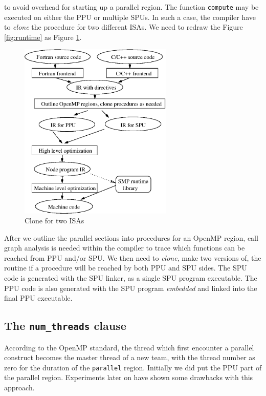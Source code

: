 to avoid overhead for starting up
a parallel region. The function \texttt{compute} may be executed on
either the PPU or multiple SPUs. In such a case, the compiler have to
\emph{clone} the procedure for two different ISAs. We need to redraw
the Figure \ref{fig:runtime} as Figure \ref{fig:clone}.

\begin{figure}[!h]
  \begin{center}
    \includegraphics[angle=0, width=0.65\textwidth]{clone.eps}
    \caption{\footnotesize Clone for two ISAs}
    \label{fig:clone}
  \end{center}
\end{figure}

After we outline the parallel sections into procedures for an OpenMP region,
call graph analysis is needed within the compiler to trace which functions can
be reached from PPU and/or SPU. We then need to \emph{clone}, make two versions
of, the routine if a procedure will be reached by both PPU and SPU sides. The
SPU code is generated with the SPU linker, as a single SPU program executable.
The PPU code is also generated with the SPU program \emph{embedded} and linked
into the final PPU executable.

\subsection{The \texttt{num\_threads} clause}

According to the OpenMP standard, the thread which first encounter a parallel
construct becomes the master thread of a new team, with the thread number as
zero for the duration of the \texttt{parallel} region. Initially we did put the
PPU part of the parallel region. Experiments later on have shown some drawbacks
with this approach.

